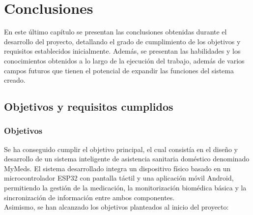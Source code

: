 \chapter{Conclusiones}
\label{cap:capitulo5}

\vspace{1cm}

En este último capítulo se presentan las conclusiones obtenidas durante el desarrollo del proyecto, detallando el grado de cumplimiento de los objetivos y requisitos establecidos inicialmente. Además, se presentan las habilidades y los conocimientos obtenidos a lo largo de la ejecución del trabajo, además de varios campos futuros que tienen el potencial de expandir las funciones del sistema creado.

\section{Objetivos y requisitos cumplidos}
\subsection{Objetivos}

Se ha conseguido cumplir el objetivo principal, el cual consistía en el diseño y desarrollo de un sistema inteligente de asistencia sanitaria doméstico denominado MyMeds. El sistema desarrollado integra un dispositivo físico basado en un microcontrolador ESP32 con pantalla táctil y una aplicación móvil Android, permitiendo la gestión de la medicación, la monitorización biomédica básica y la sincronización de información entre ambos componentes.\\

Asimismo, se han alcanzado los objetivos planteados al inicio del proyecto:

